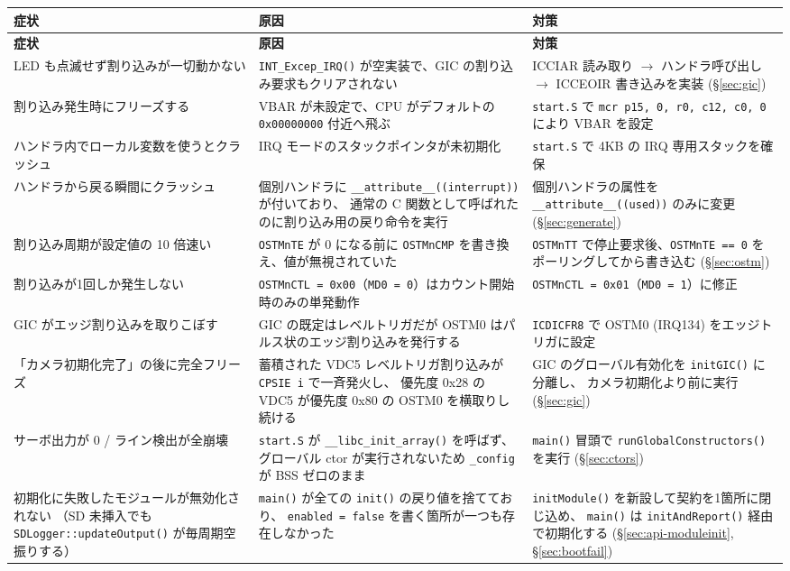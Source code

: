 \documentclass[a4paper,11pt,dvipdfmx]{jsarticle}
\begin{document}
\begin{longtable}{p{40mm} p{55mm} p{55mm}}
\toprule
\textbf{症状} & \textbf{原因} & \textbf{対策} \\
\midrule
\endfirsthead
\toprule
\textbf{症状} & \textbf{原因} & \textbf{対策} \\
\midrule
\endhead
LED も点滅せず割り込みが一切動かない &
  \texttt{INT\_Excep\_IRQ()} が空実装で、GIC の割り込み要求もクリアされない &
  ICCIAR 読み取り $\rightarrow$ ハンドラ呼び出し $\rightarrow$ ICCEOIR 書き込みを実装
  (\hyperref[sec:gic]{§\ref*{sec:gic}}) \\
割り込み発生時にフリーズする &
  VBAR が未設定で、CPU がデフォルトの \texttt{0x00000000} 付近へ飛ぶ &
  \texttt{start.S} で \texttt{mcr p15, 0, r0, c12, c0, 0} により VBAR を設定 \\
ハンドラ内でローカル変数を使うとクラッシュ &
  IRQ モードのスタックポインタが未初期化 &
  \texttt{start.S} で 4KB の IRQ 専用スタックを確保 \\
ハンドラから戻る瞬間にクラッシュ &
  個別ハンドラに \texttt{\_\_attribute\_\_((interrupt))} が付いており、
  通常の C 関数として呼ばれたのに割り込み用の戻り命令を実行 &
  個別ハンドラの属性を \texttt{\_\_attribute\_\_((used))} のみに変更
  (\hyperref[sec:generate]{§\ref*{sec:generate}}) \\
割り込み周期が設定値の 10 倍速い &
  \texttt{OSTMnTE} が 0 になる前に \texttt{OSTMnCMP} を書き換え、値が無視されていた &
  \texttt{OSTMnTT} で停止要求後、\texttt{OSTMnTE == 0} をポーリングしてから書き込む
  (\hyperref[sec:ostm]{§\ref*{sec:ostm}}) \\
割り込みが1回しか発生しない &
  \texttt{OSTMnCTL = 0x00}（\texttt{MD0 = 0}）はカウント開始時のみの単発動作 &
  \texttt{OSTMnCTL = 0x01}（\texttt{MD0 = 1}）に修正 \\
GIC がエッジ割り込みを取りこぼす &
  GIC の既定はレベルトリガだが OSTM0 はパルス状のエッジ割り込みを発行する &
  \texttt{ICDICFR8} で OSTM0 (IRQ134) をエッジトリガに設定 \\
「カメラ初期化完了」の後に完全フリーズ &
  蓄積された VDC5 レベルトリガ割り込みが \texttt{CPSIE i} で一斉発火し、
  優先度 0x28 の VDC5 が優先度 0x80 の OSTM0 を横取りし続ける &
  GIC のグローバル有効化を \texttt{initGIC()} に分離し、
  カメラ初期化より前に実行 (\hyperref[sec:gic]{§\ref*{sec:gic}}) \\
サーボ出力が 0 / ライン検出が全崩壊 &
  \texttt{start.S} が \texttt{\_\_libc\_init\_array()} を呼ばず、
  グローバル ctor が実行されないため \texttt{\_config} が BSS ゼロのまま &
  \texttt{main()} 冒頭で \texttt{runGlobalConstructors()} を実行
  (\hyperref[sec:ctors]{§\ref*{sec:ctors}}) \\
初期化に失敗したモジュールが無効化されない
（SD 未挿入でも \texttt{SDLogger::updateOutput()} が毎周期空振りする） &
  \texttt{main()} が全ての \texttt{init()} の戻り値を捨てており、
  \texttt{enabled = false} を書く箇所が一つも存在しなかった &
  \texttt{initModule()} を新設して契約を1箇所に閉じ込め、
  \texttt{main()} は \texttt{initAndReport()} 経由で初期化する
  (\hyperref[sec:api-moduleinit]{§\ref*{sec:api-moduleinit}},
  \hyperref[sec:bootfail]{§\ref*{sec:bootfail}}) \\
\bottomrule
\end{longtable}
\end{document}
